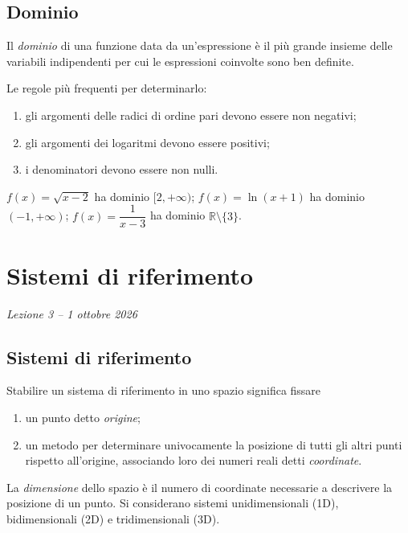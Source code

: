 \documentclass[11pt,a4paper]{article}
\begin{document}
\subsection{Dominio}

\begin{definizione}
Il \emph{dominio} di una funzione data da un'espressione è il più grande insieme delle variabili indipendenti per cui le espressioni coinvolte sono ben definite.
\end{definizione}

Le regole più frequenti per determinarlo:
\begin{enumerate}
    \item gli argomenti delle radici di ordine pari devono essere non negativi;
    \item gli argomenti dei logaritmi devono essere positivi;
    \item i denominatori devono essere non nulli.
\end{enumerate}

\begin{esempio}
$f(x) = \sqrt{x - 2}$ ha dominio $[2, +\infty)$; $f(x) = \ln(x + 1)$ ha dominio $(-1, +\infty)$; $f(x) = \dfrac{1}{x - 3}$ ha dominio $\mathbb{R} \setminus \{3\}$.
\end{esempio}

\section[Sistemi di riferimento (Lezione 3 -- 1 ottobre 2026)]{Sistemi di riferimento}
\noindent\emph{Lezione 3 -- 1 ottobre 2026}
\subsection{Sistemi di riferimento}

Stabilire un sistema di riferimento in uno spazio significa fissare
\begin{enumerate}
    \item un punto detto \emph{origine};
    \item un metodo per determinare univocamente la posizione di tutti gli altri punti rispetto all'origine, associando loro dei numeri reali detti \emph{coordinate}.
\end{enumerate}
La \emph{dimensione} dello spazio è il numero di coordinate necessarie a descrivere la posizione di un punto. Si considerano sistemi unidimensionali (1D), bidimensionali (2D) e tridimensionali (3D).
\end{document}
